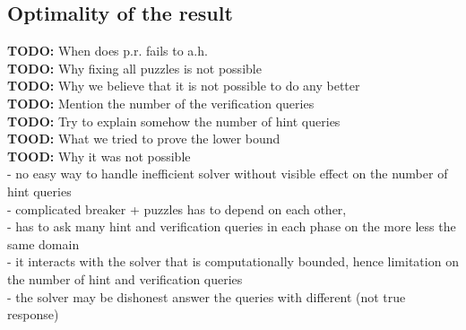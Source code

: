 \subsection{Optimality of the result}

\begin{todo}
  \textbf{TODO:} When does p.r. fails to a.h. \\
  \textbf{TODO:} Why fixing all puzzles is not possible \\
  \textbf{TODO:} Why we believe that it is not possible to do any better \\
  \textbf{TODO:} Mention the number of the verification queries  \\
  \textbf{TODO:} Try to explain somehow the number of hint queries \\
  \textbf{TOOD:} What we tried to prove the lower bound \\
  \textbf{TOOD:} Why it was not possible \\

  - no easy way to handle inefficient solver without visible effect on the number of hint queries \\
  - complicated breaker + puzzles has to depend on each other, \\
  - has to ask many hint and verification queries in each phase on the more less the same domain \\
  - it interacts with the solver that is computationally bounded, hence limitation on the number of hint and verification queries \\
  - the solver may be dishonest answer the queries with different (not true response)
\end{todo}



